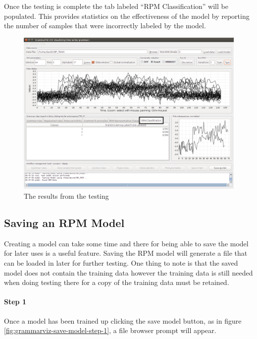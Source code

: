 \documentclass[letterpaper, 12pt]{article}
\begin{document}
\newpage
Once the testing is complete the tab labeled ``RPM Classification'' will be populated. This provides statistics on the effectiveness of the model by reporting the number of samples that were incorrectly labeled by the model.

\begin{figure}[H]
  \includegraphics[width=\textwidth]{grammarviz-testing-step-2}
  \caption{The results from the testing}
  \label{fig:grammarviz-testing-step-2}
\end{figure}

\newpage
\subsection{Saving an RPM Model}
Creating a model can take some time and there for being able to save the model for later uses is a useful feature. Saving the RPM model will generate a file that can be loaded in later for further testing. One thing to note is that the saved model does not contain the training data however the training data is still needed when doing testing there for a copy of the training data must be retained.

\paragraph{Step 1}
Once a model has been trained up clicking the save model button, as in figure \ref{fig:grammarviz-save-model-step-1}, a file browser prompt will appear.
\end{document}
